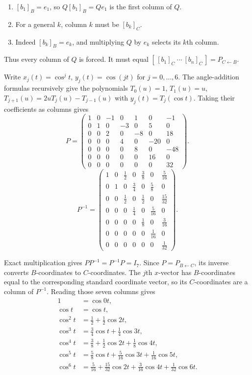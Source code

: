 \begin{enumerate}[label=(\alph*)]
\item $[b_1]_B=e_1$, so $Q[b_1]_B=Qe_1$ is the first column of $Q$.
\item For a general $k$, column $k$ must be $[b_k]_C$.
\item Indeed $[b_k]_B=e_k$, and multiplying $Q$ by $e_k$ selects its
$k$th column.
\end{enumerate}
Thus every column of $Q$ is forced. It must equal
$[\,[b_1]_C\ \cdots\ [b_n]_C\,]=P_{C\leftarrow B}$.

Write $x_j(t)=\cos^j t$, $y_j(t)=\cos(jt)$ for $j=0,\ldots,6$.
The angle-addition formulas recursively give the polynomials
$T_0(u)=1$, $T_1(u)=u$, $T_{j+1}(u)=2uT_j(u)-T_{j-1}(u)$ with
$y_j(t)=T_j(\cos t)$. Taking their coefficients as columns gives
\[ P=\begin{pmatrix}1&0&-1&0&1&0&-1\\0&1&0&-3&0&5&0\\0&0&2&0&-8&0&18\\0&0&0&4&0&-20&0\\0&0&0&0&8&0&-48\\0&0&0&0&0&16&0\\0&0&0&0&0&0&32\end{pmatrix}.\]
\[ P^{-1}=\begin{pmatrix}1&0&\frac{1}{2}&0&\frac{3}{8}&0&\frac{5}{16}\\0&1&0&\frac{3}{4}&0&\frac{5}{8}&0\\0&0&\frac{1}{2}&0&\frac{1}{2}&0&\frac{15}{32}\\0&0&0&\frac{1}{4}&0&\frac{5}{16}&0\\0&0&0&0&\frac{1}{8}&0&\frac{3}{16}\\0&0&0&0&0&\frac{1}{16}&0\\0&0&0&0&0&0&\frac{1}{32}\end{pmatrix}.\]

Exact multiplication gives $PP^{-1}=P^{-1}P=I_7$.
Since $P=P_{B\leftarrow C}$, its inverse converts $B$-coordinates to
$C$-coordinates. The $j$th $x$-vector has $B$-coordinates equal to the
corresponding standard coordinate vector, so its $C$-coordinates are a
column of $P^{-1}$. Reading those seven columns gives
\begin{align*}
 1&=\cos0t,\\
 \cos t&=\cos t,\\
 \cos^2t&=\tfrac12+\tfrac12\cos2t,\\
 \cos^3t&=\tfrac34\cos t+\tfrac14\cos3t,\\
 \cos^4t&=\tfrac38+\tfrac12\cos2t+\tfrac18\cos4t,\\
 \cos^5t&=\tfrac58\cos t+\tfrac5{16}\cos3t+\tfrac1{16}\cos5t,\\
 \cos^6t&=\tfrac5{16}+\tfrac{15}{32}\cos2t+\tfrac3{16}\cos4t+\tfrac1{32}\cos6t.
\end{align*}

